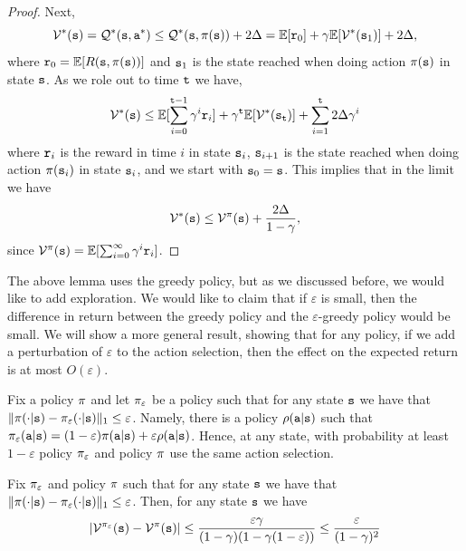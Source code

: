\begin{advanced}
\begin{proof}
Next,
$$\mathcal{V}^*({\tt s})=\mathcal{Q}^*({\tt s},{\tt a}^*)\leq \mathcal{Q}^*({\tt s},\pi({\tt s}))+2\Delta = \mathbb{E}[{\tt r}_0]+\gamma
\mathbb{E}[\mathcal{V}^*({\tt s}_1)]+2\Delta,$$ where
${\tt r}_0=\mathbb{E}[R({\tt s},\pi({\tt s}))]$ and ${\tt s}_1$ is the state
reached when doing action $\pi({\tt s})$ in state ${\tt s}$. As we
role out to time ${\tt t}$ we have,
\[
\mathcal{V}^*({\tt s})\leq \mathbb{E}[\sum_{i=0}^{{\tt t}-1} \gamma^i
{\tt r}_i]+\gamma^{\tt t}
\mathbb{E}[\mathcal{V}^*({\tt s}_{\tt t})]+\sum_{i=1}^{\tt t} 2\Delta\gamma^i
\]
where ${\tt r}_i$ is the reward in time $i$ in state ${\tt s}_i$,
${\tt s}_{i+1}$ is the state reached when doing action
$\pi({\tt s}_i)$ in state ${\tt s}_i$, and we start with
${\tt s}_0={\tt s}$.
%
This implies that in the limit we have
\[
\mathcal{V}^*({\tt s})\leq \mathcal{V}^\pi({\tt s})+\frac{
2\Delta}{1-\gamma},
\]
since $\mathcal{V}^\pi({\tt s})=\mathbb{E}[\sum_{i=0}^{\infty} \gamma^i
{\tt r}_i]$.
\end{proof}

The above lemma uses the greedy policy, but as we discussed before,
we would like to add exploration. We would like to claim that if
$\varepsilon$ is small, then the difference in return between the
greedy policy and the $\varepsilon$-greedy policy would be small. We
will show a more general result, showing that for any policy, if we
add a perturbation of $\varepsilon$ to the action selection, then
the effect on the expected return is at most $O(\varepsilon)$.

Fix a policy $\pi$ and let $\pi_\varepsilon$ be a policy
such that for any state ${\tt s}$ we have that
$\|\pi(\cdot|{\tt s})-\pi_\varepsilon(\cdot|{\tt s})\|_1\leq\varepsilon$.
Namely, there is a policy $\rho({\tt a}|{\tt s})$ such that
$\pi_\varepsilon({\tt a}|{\tt s})=(1-\varepsilon)\pi({\tt a}|{\tt s})+\varepsilon
\rho({\tt a}|{\tt s})$. Hence, at any state, with probability at
least $1-\varepsilon$ policy $\pi_\varepsilon$ and policy
$\pi$ use the same action selection.

\begin{lemma}
\label{lemma:epsilon-greedy}
%
Fix $\pi_\varepsilon$ and policy $\pi$ such that for any
state ${\tt s}$ we have that
$\|\pi(\cdot|{\tt s})-\pi_\varepsilon(\cdot|{\tt s})\|_1\leq\varepsilon$.
Then, for any state ${\tt s}$ we have
\[
|\mathcal{V}^{\pi_\varepsilon}({\tt s})-\mathcal{V}^\pi({\tt s})|\leq
\frac{\varepsilon\gamma}{(1-\gamma)(1-\gamma(1-\varepsilon))}\leq \frac{\varepsilon}{(1-\gamma)^2}
\]
\end{lemma}


\end{advanced}

